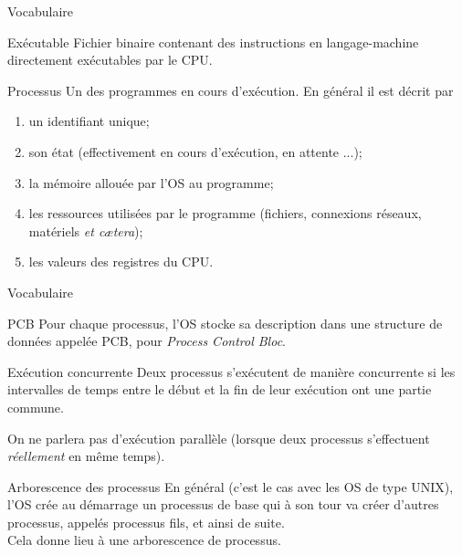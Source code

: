 \documentclass[10pt]{beamer}
\begin{document}
\begin{frame}{Vocabulaire}
\begin{block}{Exécutable}
Fichier binaire contenant des instructions en langage-machine directement exécutables par le CPU.
\end{block}

\begin{block}{Processus}
Un des programmes en cours d'exécution. En général il est décrit par
\begin{enumerate}[--]
	\item un \alert{identifiant} unique;
    \item son \alert{état} (effectivement en cours d'exécution, en attente ...);
    \item la \alert{mémoire} allouée par l'OS au programme;
    \item les \alert{ressources} utilisées par le programme (fichiers, connexions réseaux, matériels \textit{et c\ae tera});
    \item les \alert{valeurs des registres} du CPU.
\end{enumerate}

\end{block}
\end{frame}
\begin{frame}{Vocabulaire}
\begin{block}{PCB}
Pour chaque processus, l'OS stocke sa description dans une structure de données appelée \alert{PCB}, pour \textit{Process Control Bloc}.
\end{block}


\begin{block}{Exécution concurrente}
Deux processus s'exécutent de manière concurrente si les intervalles de temps entre le début et la fin de leur exécution ont une partie commune.
\end{block}
On ne parlera pas d'exécution \alert{parallèle} (lorsque deux processus s'effectuent \textit{réellement} en même temps).
\end{frame}

\begin{frame}{Arborescence des processus}
En général (c'est le cas avec les OS de type \textsc{UNIX}), l'OS crée au démarrage un processus de base qui à son tour va créer d'autres processus, appelés \alert{processus fils}, et ainsi de suite.\\

Cela donne lieu à une \alert{arborescence de processus}.
\end{frame}
\end{document}
